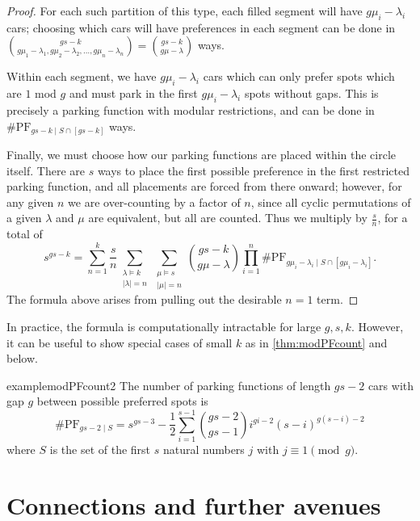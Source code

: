 \documentclass[12 pt]{amsart}
\theoremstyle{definition} %
\theoremstyle{remark} %
\begin{document}
\begin{proof}
    For each such partition of this type, each filled segment will have $g\mu_i-\lambda_i$ cars; choosing which cars will have preferences in each segment can be done in $\binom{gs - k}{g \mu_1 - \lambda_1,g \mu_2 - \lambda_2,\ldots,g \mu_n - \lambda_n}=\binom{gs - k}{g \mu - \lambda}$ ways.
    
    Within each segment, we have $g\mu_i-\lambda_i$ cars which can only prefer spots which are $1$ mod $g$ and must park in the first $g\mu_i-\lambda_i$ spots without gaps. This is precisely a parking function with modular restrictions, and can be done in $\# \mathrm{PF}_{gs - k \mid S \cap [gs - k]}$ ways.

    Finally, we must choose how our parking functions are placed within the circle itself. There are $s$ ways to place the first possible preference in the first restricted parking function, and all placements are forced from there onward; however, for any given $n$ we are over-counting by a factor of $n$, since all cyclic permutations of a given $\lambda$ and $\mu$ are equivalent, but all are counted. Thus we multiply by $\frac{s}{n}$, for a total of 
    \[
	    s^{gs - k} = \sum_{n = 1}^{k} \frac{s}{n} \sum_{\substack{\lambda \vDash k \\ \lvert\lambda\rvert = n}} \sum_{\substack{\mu \vDash s \\\lvert \mu \rvert = n}} \binom{gs - k}{g \mu - \lambda} \prod_{i = 1}^{n} \# \mathrm{PF}_{g \mu_{i} - \lambda_{i} \mid S \cap [g \mu_{i} - \lambda_{i}]}.
    \]
    The formula above arises from pulling out the desirable $n = 1$ term.
\end{proof}

In practice, the formula is computationally intractable for large $g, s, k$. However, it can be useful to show special cases of small $k$ as in \cref{thm:modPFcount} and below.

\begin{restatable}{example}{modPFcount2}
	The number of parking functions of length $gs - 2$ cars with gap $g$ between possible preferred spots is
	\[
		\#\mathrm{PF}_{gs - 2 \mid S} = s^{gs - 3} - \frac{1}{2} \sum_{i = 1}^{s - 1} \binom{gs - 2}{gs - 1} i^{gi - 2} (s - i)^{g(s - i) - 2}
	\]
	where $S$ is the set of the first $s$ natural numbers $j$ with $j \equiv 1 \pmod g$.
\end{restatable}

\section{Connections and further avenues} \label{sec:connections}
\end{document}

